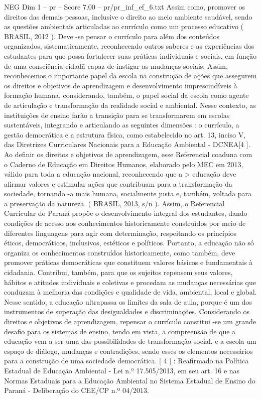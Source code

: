 \begin{textsample}{NEG Dim 1 – pr – Score 7.00 – pr/pr\_inf\_ef\_6.txt}
Assim como, promover os direitos das demais pessoas, inclusive o direito ao meio ambiente saudável, sendo as questões ambientais articuladas ao currículo como um processo educativo ( BRASIL, 2012 ).
Deve -se pensar o currículo para além dos conteúdos organizados, sistematicamente, reconhecendo outros saberes e as experiências dos estudantes para que possa fortalecer suas práticas individuais e sociais, em função de uma consciência cidadã capaz de instigar as mudanças sociais.
Assim, reconhecemos o importante papel da escola na construção de ações que assegurem os direitos e objetivos de aprendizagem e desenvolvimento imprescindíveis à formação humana, considerando, também, o papel social da escola como agente de articulação e transformação da realidade social e ambiental.
Nesse contexto, as instituições de ensino farão a transição para se transformarem em escolas sustentáveis, integrando e articulando as seguintes dimensões : o currículo, a gestão democrática e a estrutura física, como estabelecido no art. 13, inciso V, das Diretrizes Curriculares Nacionais para a Educação Ambiental - DCNEA[4 ].
Ao definir os direitos e objetivos de aprendizagem, esse Referencial coaduna com o Caderno de Educação em Direitos Humanos, elaborado pelo MEC em 2013, válido para toda a educação nacional, reconhecendo que a > educação deve afirmar valores e estimular ações que contribuam para a transformação da sociedade, tornando -a mais humana, socialmente justa e, também, voltada para a preservação da natureza. ( BRASIL, 2013, s/n ).
Assim, o Referencial Curricular do Paraná propõe o desenvolvimento integral dos estudantes, dando condições de acesso aos conhecimentos historicamente construídos por meio de diferentes linguagens para agir com determinação, respeitando os princípios éticos, democráticos, inclusivos, estéticos e políticos.
Portanto, a educação não só organiza os conhecimentos construídos historicamente, como também, deve promover práticas democráticas que constituem valores básicos e fundamentais à cidadania.
Contribui, também, para que os sujeitos repensem seus valores, hábitos e atitudes individuais e coletivas e procedam as mudanças necessárias que conduzam à melhoria das condições e qualidade de vida, ambiental, local e global.
Nesse sentido, a educação ultrapassa os limites da sala de aula, porque é um dos instrumentos de superação das desigualdades e discriminações.
Considerando os direitos e objetivos de aprendizagem, repensar o currículo constitui -se um grande desafio para os sistemas de ensino, tendo em vista, a compreensão de que a educação vem a ser uma das possibilidades de transformação social, e a escola um espaço de diálogo, mudanças e contradições, sendo esses os elementos necessários para a construção de uma sociedade democrática. [ 4 ] : Reafirmado na Política Estadual de Educação Ambiental - Lei n.º 17.505/2013, em seu art. 16 e nas Normas Estaduais para a Educação Ambiental no Sistema Estadual de Ensino do Paraná - Deliberação do CEE/CP n.º 04/2013.

\end{textsample}
